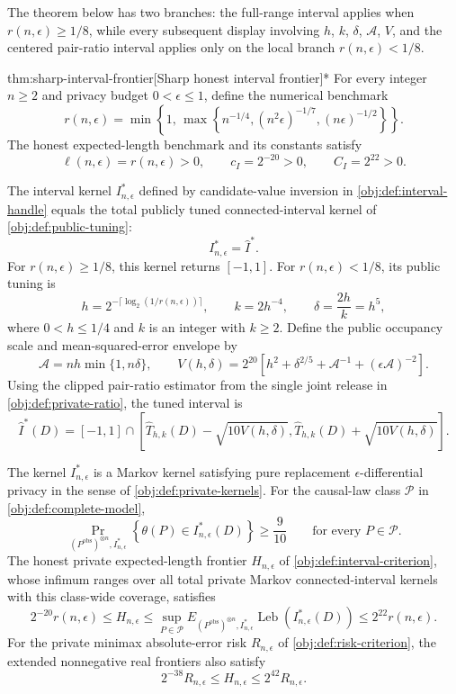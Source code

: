 \documentclass[11pt]{article}
\begin{document}
The theorem below has two branches: the full-range interval applies when \(r(n,\epsilon)\ge1/8\), while every subsequent display involving \(h\), \(k\), \(\delta\), \(\mathcal A\), \(V\), and the centered pair-ratio interval applies only on the local branch \(r(n,\epsilon)<1/8\).

\begin{theoremv}{thm:sharp-interval-frontier}[Sharp honest interval frontier]*
For every integer \(n\ge2\) and privacy budget \(0<\epsilon\le1\), define the numerical benchmark
\[
r(n,\epsilon)
=
\min\left\{1,\,
\max\left\{
n^{-1/4},
(n^2\epsilon)^{-1/7},
(n\epsilon)^{-1/2}
\right\}\right\}.
\]
The honest expected-length benchmark and its constants satisfy
\[
\ell(n,\epsilon)=r(n,\epsilon)>0,
\qquad
c_I=2^{-20}>0,
\qquad
C_I=2^{22}>0.
\]

The interval kernel \(I^*_{n,\epsilon}\) defined by candidate-value inversion in \cref{obj:def:interval-handle} equals the total publicly tuned connected-interval kernel of \cref{obj:def:public-tuning}:
\[
I^*_{n,\epsilon}=\widehat I^*.
\]
For \(r(n,\epsilon)\ge1/8\), this kernel returns \([-1,1]\). For \(r(n,\epsilon)<1/8\), its public tuning is
\[
h=2^{-\lceil\log_2(1/r(n,\epsilon))\rceil},
\qquad
k=2h^{-4},
\qquad
\delta=\frac{2h}{k}=h^5,
\]
where \(0<h\le1/4\) and \(k\) is an integer with \(k\ge2\). Define the public occupancy scale and mean-squared-error envelope by
\[
\mathcal A=nh\min\{1,n\delta\},
\qquad
V(h,\delta)
=
2^{20}\left[
h^2+\delta^{2/5}+\mathcal A^{-1}
+(\epsilon\mathcal A)^{-2}
\right].
\]
Using the clipped pair-ratio estimator from the single joint release in \cref{obj:def:private-ratio}, the tuned interval is
\[
\widehat I^*(D)
=
[-1,1]\cap
\left[
\widehat T_{h,k}(D)-\sqrt{10V(h,\delta)},
\widehat T_{h,k}(D)+\sqrt{10V(h,\delta)}
\right].
\]

The kernel \(I^*_{n,\epsilon}\) is a Markov kernel satisfying pure replacement \(\epsilon\)-differential privacy in the sense of \cref{obj:def:private-kernels}. For the causal-law class \(\mathcal P\) in \cref{obj:def:complete-model},
\[
\Pr_{(P^{\mathrm{obs}})^{\otimes n},I^*_{n,\epsilon}}
\left\{\theta(P)\in I^*_{n,\epsilon}(D)\right\}
\ge\frac9{10}
\qquad\text{for every }P\in\mathcal P.
\]
The honest private expected-length frontier \(H_{n,\epsilon}\) of \cref{obj:def:interval-criterion}, whose infimum ranges over all total private Markov connected-interval kernels with this class-wide coverage, satisfies
\[
2^{-20}r(n,\epsilon)
\le H_{n,\epsilon}
\le
\sup_{P\in\mathcal P}
E_{(P^{\mathrm{obs}})^{\otimes n},I^*_{n,\epsilon}}
\operatorname{Leb}\!\left(I^*_{n,\epsilon}(D)\right)
\le2^{22}r(n,\epsilon).
\]
For the private minimax absolute-error risk \(R_{n,\epsilon}\) of \cref{obj:def:risk-criterion}, the extended nonnegative real frontiers also satisfy
\[
2^{-38}R_{n,\epsilon}
\le H_{n,\epsilon}
\le2^{42}R_{n,\epsilon}.
\]
\end{theoremv}
\end{document}
